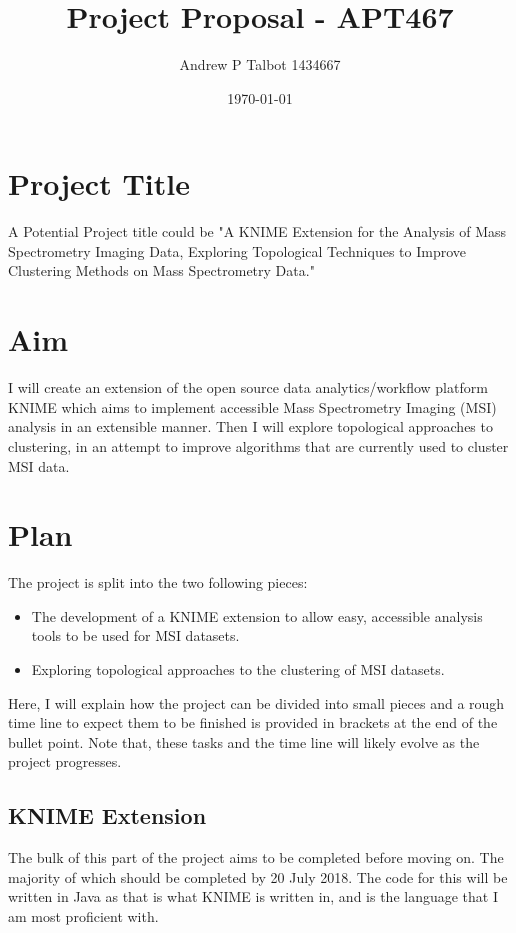 \documentclass{article}
\begin{document}
\title{Project Proposal - APT467}
\author{Andrew P Talbot 1434667}
\date{\today}
\maketitle

\section{Project Title}
A Potential Project title could be "A KNIME Extension for the Analysis of Mass Spectrometry Imaging Data, Exploring Topological Techniques to Improve Clustering Methods on Mass Spectrometry Data."

\section{Aim}
I will create an extension of the open source data analytics/workflow platform KNIME which aims to implement accessible Mass Spectrometry Imaging (MSI) analysis in an extensible manner. Then I will explore topological approaches to clustering, in an attempt to improve algorithms that are currently used to cluster MSI data.

\section{Plan}
The project is split into the two following pieces:

\begin{itemize}
	\item The development of a KNIME extension to allow easy, accessible analysis tools to be used for MSI datasets.
    \item Exploring topological approaches to the clustering of MSI datasets.
\end{itemize}

Here, I will explain how the project can be divided into small pieces and a rough time line to expect them to be finished is provided in brackets at the end of the bullet point. Note that, these tasks and the time line will likely evolve as the project progresses.

\subsection{KNIME Extension}
The bulk of this part of the project aims to be completed before moving on. The majority of which should be completed by 20 July 2018. The code for this will be written in Java as that is what KNIME is written in, and is the language that I am most proficient with.
\end{document}
